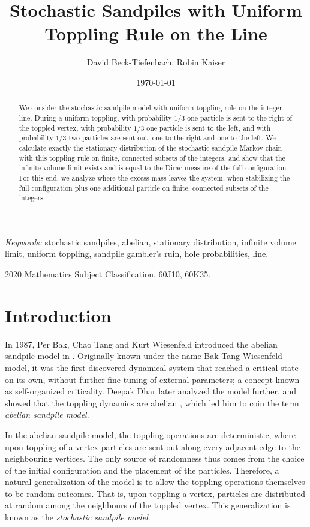 \documentclass[11pt]{article}
\title{Stochastic Sandpiles with Uniform Toppling Rule on the Line}
\author{David Beck-Tiefenbach, Robin Kaiser}
\date{\today}
\begin{document}
\maketitle
\begin{abstract}
    We consider the stochastic sandpile model with uniform toppling rule on the integer line. During a uniform toppling, with probability $1/3$ one particle is sent to the right of the toppled vertex, with probability $1/3$ one particle is sent to the left, and with probability $1/3$ two particles are sent out, one to the right and one to the left. We calculate exactly the stationary distribution of the stochastic sandpile Markov chain with this toppling rule on finite, connected subsets of the integers, and show that the infinite volume limit exists and is equal to the Dirac measure of the full configuration. For this end, we analyze where the excess mass leaves the system, when stabilizing the full configuration plus one additional particle on finite, connected subsets of the integers.
\end{abstract}

{\it Keywords:} stochastic sandpiles, abelian, stationary distribution, infinite volume limit, uniform toppling, sandpile gambler's ruin, hole probabilities, line.

{2020 Mathematics Subject Classification.} 60J10, 60K35.

\section{Introduction}\label{sec:intro}
In 1987, Per Bak, Chao Tang and Kurt Wiesenfeld introduced the abelian sandpile model in \cite{BTW87,BTW88}. Originally known under the name Bak-Tang-Wiesenfeld model, it was the first discovered dynamical system that reached a critical state on its own, without further fine-tuning of external parameters; a concept known as self-organized criticality. Deepak Dhar later analyzed the model further, and showed that the toppling dynamics are abelian \cite{D90}, which led him to coin the term {\it abelian sandpile model}.

In the abelian sandpile model, the toppling operations are deterministic, where upon toppling of a vertex particles are sent out along every adjacent edge to the neighbouring vertices. The only source of randomness thus comes from the choice of the initial configuration and the placement of the particles. Therefore, a natural generalization of the model is to allow the toppling operations themselves to be random outcomes. That is, upon toppling a vertex, particles are distributed at random among the neighbours of the toppled vertex. This generalization is known as the {\it stochastic sandpile model}.
\end{document}
